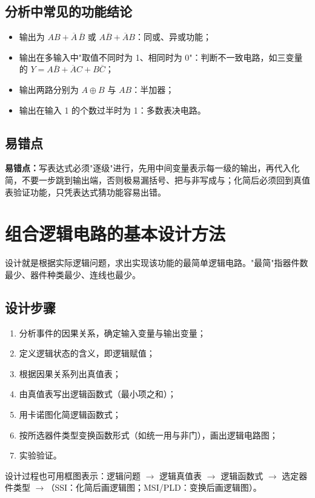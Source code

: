 \subsection{分析中常见的功能结论}
\begin{itemize}
    \item 输出为 \(AB+\overline{A}\,\overline{B}\) 或 \(A\overline{B}+\overline{A}B\)：同或、异或功能；
    \item 输出在多输入中"取值不同时为 1、相同时为 0"：判断不一致电路，如三变量的
    \(Y=A\overline{B}+\overline{A}C+B\overline{C}\)；
    \item 输出两路分别为 \(A\oplus B\) 与 \(AB\)：半加器；
    \item 输出在输入 1 的个数过半时为 1：多数表决电路。
\end{itemize}

\subsection{易错点}
\textbf{易错点：}写表达式必须"逐级"进行，先用中间变量表示每一级的输出，再代入化简，不要一步跳到输出端，否则极易漏括号、把与非写成与；化简后必须回到真值表验证功能，只凭表达式猜功能容易出错。

\section{组合逻辑电路的基本设计方法}
设计就是根据实际逻辑问题，求出实现该功能的最简单逻辑电路。"最简"指器件数最少、器件种类最少、连线也最少。

\subsection{设计步骤}
\begin{enumerate}
    \item 分析事件的因果关系，确定输入变量与输出变量；
    \item 定义逻辑状态的含义，即逻辑赋值；
    \item 根据因果关系列出真值表；
    \item 由真值表写出逻辑函数式（最小项之和）；
    \item 用卡诺图化简逻辑函数式；
    \item 按所选器件类型变换函数形式（如统一用与非门），画出逻辑电路图；
    \item 实验验证。
\end{enumerate}

设计过程也可用框图表示：逻辑问题 \(\rightarrow\) 逻辑真值表 \(\rightarrow\) 逻辑函数式 \(\rightarrow\) 选定器件类型 \(\rightarrow\)（SSI：化简后画逻辑图；MSI/PLD：变换后画逻辑图）。

